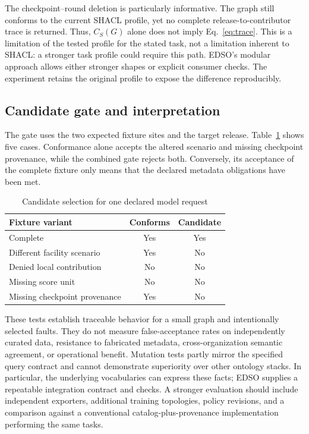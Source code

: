 \documentclass[conference]{IEEEtran}
\begin{document}
The checkpoint--round deletion is particularly informative. The graph still conforms to the current SHACL profile, yet no complete release-to-contributor trace is returned. Thus, $C_S(G)$ alone does not imply Eq.~\eqref{eq:trace}. This is a limitation of the tested profile for the stated task, not a limitation inherent to SHACL: a stronger task profile could require this path. EDSO's modular approach allows either stronger shapes or explicit consumer checks. The experiment retains the original profile to expose the difference reproducibly.

\subsection{Candidate gate and interpretation}
The gate uses the two expected fixture sites and the target release. Table~\ref{tab:gate} shows five cases. Conformance alone accepts the altered scenario and missing checkpoint provenance, while the combined gate rejects both. Conversely, its acceptance of the complete fixture only means that the declared metadata obligations have been met.

\begin{table}[t]
\caption{Candidate selection for one declared model request}
\label{tab:gate}
\centering\small
\begin{tabular}{@{}p{}cc@{}}
\toprule
Fixture variant & Conforms & Candidate \\
\midrule
Complete & Yes & Yes \\
Different facility scenario & Yes & No \\
Denied local contribution & No & No \\
Missing score unit & No & No \\
Missing checkpoint provenance & Yes & No \\
\bottomrule
\end{tabular}
\end{table}

These tests establish traceable behavior for a small graph and intentionally selected faults. They do not measure false-acceptance rates on independently curated data, resistance to fabricated metadata, cross-organization semantic agreement, or operational benefit. Mutation tests partly mirror the specified query contract and cannot demonstrate superiority over other ontology stacks. In particular, the underlying vocabularies can express these facts; EDSO supplies a repeatable integration contract and checks. A stronger evaluation should include independent exporters, additional training topologies, policy revisions, and a comparison against a conventional catalog-plus-provenance implementation performing the same tasks.
\end{document}
